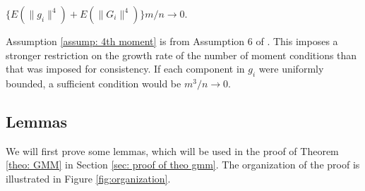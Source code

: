 \documentclass[12pt]{article}
\begin{document}
{\begin{assum} \label{assump: 4th moment}
 $ \{ E(\|g_i\|^4)+E(\|G_i\|^4)  \}m/n \rightarrow0$. 
\end{assum}
 Assumption \ref{assump: 4th moment} is from Assumption 6 of \cite{Newey:2009aa}. This imposes a stronger restriction on the growth rate of the number of moment conditions than that was imposed for consistency. If each component in $g_i$ were uniformly bounded, a sufficient condition would be $m^3/n\rightarrow 0$.  
 





\subsection{Lemmas}
We will first prove some  lemmas, which will be used in the proof of Theorem \ref{theo: GMM} in Section \ref{sec: proof of theo gmm}. The organization of the proof is illustrated in Figure \ref{fig:organization}. 

}
\end{document}
